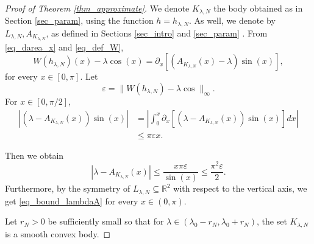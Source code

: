 \documentclass{amsart}
\def \R{\mathbb R}
\begin{document}
\begin{proof}[Proof of Theorem \ref{thm_approximate}]
We denote $K_{\lambda,N}$ the body obtained as in Section \ref{sec_param}, using the function $h = h_{\lambda,N}$.
As well, we denote by $L_{\lambda, N}, A_{K_{\lambda, N}}$, as defined in Sections \ref{sec_intro} and \ref{sec_param} .
From \eqref{eq_darea_x} and \eqref{eq_def_W},
\begin{equation}
	\label{eq_bound_WD}
	W(h_{\lambda,N})(x) - \lambda \cos(x) = \partial_x[ (A_{K_{\lambda,N}}(x) - \lambda) \sin(x)],
\end{equation}
for every $x \in [0,\pi]$.
Let
\begin{equation}
	\label{eq_def_epsilon}
	\varepsilon = \|W(h_{\lambda,N}) - \lambda \cos\|_\infty .
\end{equation}
For $x \in [0,\pi/2]$,
\begin{align}
	|( \lambda - A_{K_{\lambda,N}}(x)) \sin(x)|
&= \left| \int_0^x \partial_x[ (\lambda - A_{K_{\lambda,N}}(x)) \sin(x) ] dx \right| \\
&\leq \pi \varepsilon x.
\end{align}

Then we obtain
\begin{equation}
	\label{eq_bound_lambdaA}
	|\lambda - A_{K_{\lambda,N}}(x)| \leq \frac{x \pi\varepsilon}{\sin(x)} \leq \frac{\pi^2\varepsilon}{2}.
\end{equation}
Furthermore, by the symmetry of $L_{\lambda,N} \subseteq \R^2$ with respect to the vertical axis, we get \eqref{eq_bound_lambdaA} for every $x \in (0,\pi)$.

Let $r_N > 0$ be sufficiently small so that for $\lambda \in (\lambda_0 - r_N, \lambda_0 + r_N)$, the set $K_{\lambda,N}$ is a smooth convex body.

\end{proof}
\end{document}
